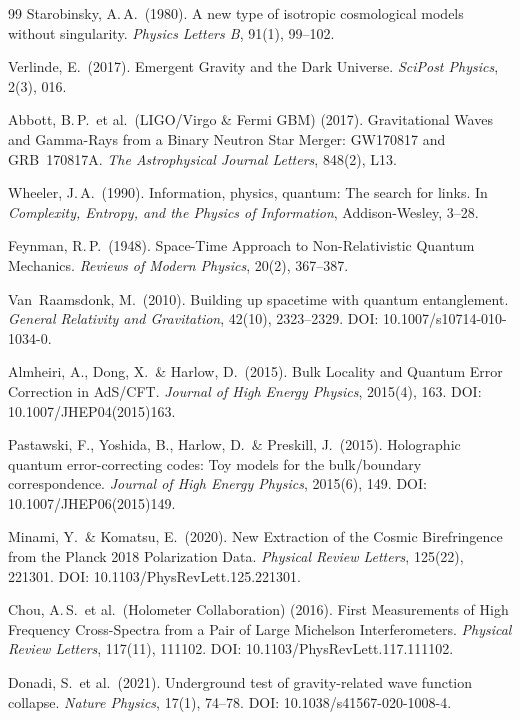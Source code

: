\documentclass[11pt,a4paper]{article}
\begin{document}
\begin{thebibliography}{99}
Starobinsky, A.\,A.\ (1980).
A new type of isotropic cosmological models without singularity.
\textit{Physics Letters B}, 91(1), 99--102.

Verlinde, E.\ (2017).
Emergent Gravity and the Dark Universe.
\textit{SciPost Physics}, 2(3), 016.

Abbott, B.\,P.\ et al.\ (LIGO/Virgo \& Fermi GBM) (2017).
Gravitational Waves and Gamma-Rays from a Binary Neutron Star Merger: GW170817 and GRB~170817A.
\textit{The Astrophysical Journal Letters}, 848(2), L13.

Wheeler, J.\,A.\ (1990).
Information, physics, quantum: The search for links.
In \textit{Complexity, Entropy, and the Physics of Information}, Addison-Wesley, 3--28.

Feynman, R.\,P.\ (1948).
Space-Time Approach to Non-Relativistic Quantum Mechanics.
\textit{Reviews of Modern Physics}, 20(2), 367--387.

Van~Raamsdonk, M.\ (2010).
Building up spacetime with quantum entanglement.
\textit{General Relativity and Gravitation}, 42(10), 2323--2329.
DOI: 10.1007/s10714-010-1034-0.

Almheiri, A., Dong, X.\ \& Harlow, D.\ (2015).
Bulk Locality and Quantum Error Correction in AdS/CFT.
\textit{Journal of High Energy Physics}, 2015(4), 163.
DOI: 10.1007/JHEP04(2015)163.

Pastawski, F., Yoshida, B., Harlow, D.\ \& Preskill, J.\ (2015).
Holographic quantum error-correcting codes: Toy models for the bulk/boundary correspondence.
\textit{Journal of High Energy Physics}, 2015(6), 149.
DOI: 10.1007/JHEP06(2015)149.

Minami, Y.\ \& Komatsu, E.\ (2020).
New Extraction of the Cosmic Birefringence from the Planck 2018 Polarization Data.
\textit{Physical Review Letters}, 125(22), 221301.
DOI: 10.1103/PhysRevLett.125.221301.

Chou, A.\,S.\ et al.\ (Holometer Collaboration) (2016).
First Measurements of High Frequency Cross-Spectra from a Pair of Large Michelson Interferometers.
\textit{Physical Review Letters}, 117(11), 111102.
DOI: 10.1103/PhysRevLett.117.111102.

Donadi, S.\ et al.\ (2021).
Underground test of gravity-related wave function collapse.
\textit{Nature Physics}, 17(1), 74--78.
DOI: 10.1038/s41567-020-1008-4.


\end{thebibliography}
\end{document}

